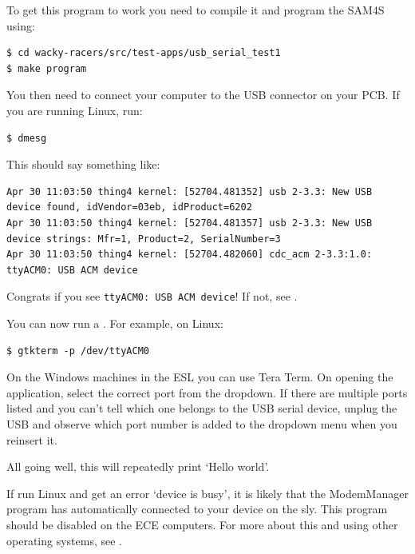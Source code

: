 \inputminted{C}{../../src/test-apps/usb_serial_test1/usb_serial_test1.c}

To get this program to work you need to compile it and program the
SAM4S using:
%
\begin{verbatim}
$ cd wacky-racers/src/test-apps/usb_serial_test1
$ make program
\end{verbatim}

You then need to connect your computer to the USB connector on your PCB.
If you are running Linux, run:
%
\begin{verbatim}
$ dmesg
\end{verbatim}

This should say something like:
%
\begin{verbatim}
Apr 30 11:03:50 thing4 kernel: [52704.481352] usb 2-3.3: New USB device found, idVendor=03eb, idProduct=6202
Apr 30 11:03:50 thing4 kernel: [52704.481357] usb 2-3.3: New USB device strings: Mfr=1, Product=2, SerialNumber=3
Apr 30 11:03:50 thing4 kernel: [52704.482060] cdc_acm 2-3.3:1.0: ttyACM0: USB ACM device
\end{verbatim}

Congrats if you see \texttt{ttyACM0:\ USB\ ACM\ device}!  If not, see
.

You can now run a . For example, on Linux:
%
\begin{verbatim}
$ gtkterm -p /dev/ttyACM0
\end{verbatim}

On the Windows machines in the ESL you can use Tera Term. On opening the
application, select the correct  port from the 
dropdown. If there are multiple  ports listed and you can't
tell which one belongs to the USB serial device, unplug the USB and
observe which  port number is added to the dropdown menu when
you reinsert it.

All going well, this will repeatedly print `Hello world'.

If run Linux and get an error `device is busy', it is likely that the
ModemManager program has automatically connected to your device on the
sly. This program should be disabled on the ECE computers. For more
about this and using other operating systems, see .

